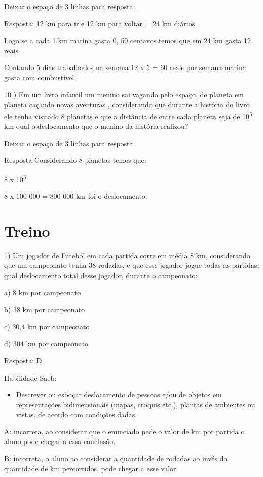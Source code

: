 Deixar o espaço de 3 linhas para resposta.

Resposta: 12 km para ir e 12 km para voltar = 24 km diários

Logo se a cada 1 km marina gasta 0, 50 centavos temos que em 24 km gasta
12 reais

Contando 5 dias trabalhados na semana 12 x 5 = 60 reais por semana
marina gasta com combustível

10 ) Em um livro infantil um menino sai vagando pelo espaço, de planeta
em planeta caçando novas aventuras , considerando que durante a história
do livro ele tenha visitado 8 planetas e que a distância de entre cada
planeta seja de 10\textsuperscript{5} km qual o deslocamento que o
menino da história realizou?

Deixar o espaço de 3 linhas para resposta.

Resposta Considerando 8 planetas temos que:

8 x 10\textsuperscript{5}

8 x 100 000 = 800 000 km foi o deslocamento.

\section{Treino}

1) Um jogador de Futebol em cada partida corre em média 8 km,
considerando que um campeonato tenha 38 rodadas, e que esse jogador
jogue todas as partidas, qual deslocamento total desse jogador, durante
o campeonato:

a) 8 km por campeonato

b) 38 km por campeonato

c) 30,4 km por campeonato

d) 304 km por campeonato

Resposta: D

Habilidade Saeb:

\begin{itemize}
\tightlist
\item
  Descrever ou esboçar deslocamento de pessoas e/ou de objetos em
  representações bidimensionais (mapas, croquis etc.), plantas de
  ambientes ou vistas, de acordo com condições dadas.
\end{itemize}

A: incorreta, ao considerar que o enunciado pede o valor de km por
partida o aluno pode chegar a essa conclusão.

B: incorreta, o aluno ao considerar a quantidade de rodadas ao invés da
quantidade de km percorridos, pode chegar a esse valor

